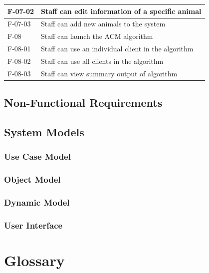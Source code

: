 \documentclass{article}
\begin{document}
\begin{tabular}{ll}
\indent F-07-02 & Staff can edit information of a specific animal \\ \hline

\indent F-07-03 & Staff can add new animals to the system \\ \hline

F-08 & Staff can launch the ACM algorithm \\ \hline

\indent F-08-01 & Staff can use an individual client in the algorithm \\ \hline

\indent F-08-02 & Staff can use all clients in the algorithm \\ \hline

\indent F-08-03 & Staff can view summary output of algorithm \\ \hline

\end{tabular}


\subsection{Non-Functional Requirements}

\subsection{System Models}

\subsubsection{Use Case Model}

\subsubsection{Object Model}

\subsubsection{Dynamic Model}

\subsubsection{User Interface}

\section{Glossary}
\end{document}
